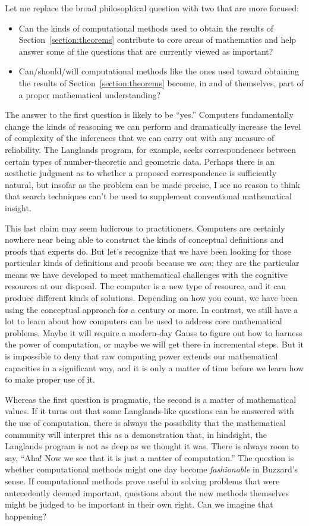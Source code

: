 \documentclass{amsart}
\theoremstyle{definition}
\theoremstyle{remark}
\numberwithin{equation}{section}
\begin{document}
Let me replace the broad philosophical question with two that are more focused:
\begin{itemize}
  \item Can the kinds of computational methods used to obtain the results of Section~\ref{section:theorems} contribute to core areas of mathematics and help answer some of the questions that are currently viewed as important?
  \item Can/should/will computational methods like the ones used toward obtaining the results of Section~\ref{section:theorems} become, in and of themselves, part of a proper mathematical understanding?
\end{itemize}

The answer to the first question is likely to be ``yes.'' Computers fundamentally change the kinds of reasoning we can perform and dramatically increase the level of complexity of the inferences that we can carry out with any measure of reliability. The Langlands program, for example, seeks correspondences between certain types of number-theoretic and geometric data. Perhaps there is an aesthetic judgment as to whether a proposed correspondence is sufficiently natural, but insofar as the problem can be made precise, I see no reason to think that search techniques can't be used to supplement conventional mathematical insight.

This last claim may seem ludicrous to practitioners. Computers are certainly nowhere near being able to construct the kinds of conceptual definitions and proofs that experts do. But let's recognize that we have been looking for those particular kinds of definitions and proofs because we \emph{can}; they are the particular means we have developed to meet mathematical challenges with the cognitive resources at our disposal. The computer is a new type of resource, and it can produce different kinds of solutions. Depending on how you count, we have been using the conceptual approach for a century or more. In contrast, we still have a lot to learn about how computers can be used to address core mathematical problems. Maybe it will require a modern-day Gauss to figure out how to harness the power of computation, or maybe we will get there in incremental steps. But it is impossible to deny that raw computing power extends our mathematical capacities in a significant way, and it is only a matter of time before we learn how to make proper use of it.

Whereas the first question is pragmatic, the second is a matter of mathematical values. If it turns out that some Langlands-like questions can be answered with the use of computation, there is always the possibility that the mathematical community will interpret this as a demonstration that, in hindsight, the Langlands program is not as deep as we thought it was. There is always room to say, ``Aha! Now we see that it is just a matter of computation.'' The question is whether computational methods might one day become \emph{fashionable} in Buzzard's sense. If computational methods prove useful in solving problems that were antecedently deemed important, questions about the new methods themselves might be judged to be important in their own right. Can we imagine that happening?
\end{document}
